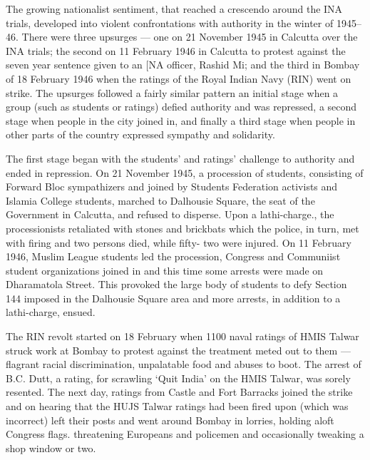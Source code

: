 The growing nationalist sentiment, that reached a crescendo around the INA trials, developed into violent confrontations with authority in the winter of 1945--46. There were three upsurges --- one on 21 November 1945 in Calcutta over the INA trials; the second on 11 February 1946 in Calcutta to protest against the seven year sentence given to an [NA officer, Rashid Mi; and the third in Bombay of 18 February 1946 when the ratings of the Royal Indian Navy (RIN) went on strike. The upsurges followed a fairly similar pattern an initial stage when a group (such as students or ratings) defied authority and was repressed, a second stage when people in the city joined in, and finally a third stage when people in other parts of the country expressed sympathy and solidarity. 

The first stage began with the students' and ratings' challenge to authority and ended in repression. On 21 November 1945, a procession of students, consisting of Forward Bloc sympathizers and joined by Students Federation activists and Islamia College students, marched to Dalhousie Square, the seat of the Government in Calcutta, and refused to disperse. Upon a lathi-charge., the processionists retaliated with stones and brickbats which the police, in turn, met with firing and two persons died, while fifty- two were injured. On 11 February 1946, Muslim League students led the procession, Congress and Communiist student organizations joined in and this time some arrests were made on Dharamatola Street. This provoked the large body of students to defy Section 144 imposed in the Dalhousie Square area and more arrests, in addition to a lathi-charge, ensued. 

The RIN revolt started on 18 February when 1100 naval ratings of HMIS Talwar struck work at Bombay to protest against the treatment meted out to them --- flagrant racial discrimination, unpalatable food and abuses to boot. The arrest of B.C. Dutt, a rating, for scrawling `Quit India' on the HMIS Talwar, was sorely resented. The next day, ratings from Castle and Fort Barracks joined the strike and on hearing that the HUJS Talwar ratings had been fired upon (which was incorrect) left their posts and went around Bombay in lorries, holding aloft Congress flags. threatening Europeans and policemen and occasionally tweaking a shop window or two. 

